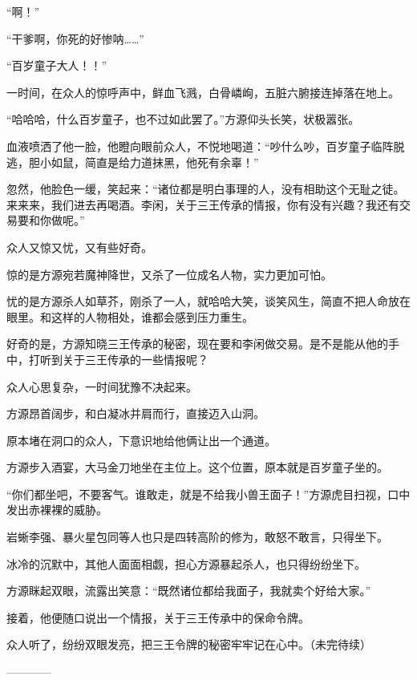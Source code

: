 \begin{this_body}
“啊！”

“干爹啊，你死的好惨呐……”

“百岁童子大人！！”

一时间，在众人的惊呼声中，鲜血飞溅，白骨嶙峋，五脏六腑接连掉落在地上。

“哈哈哈，什么百岁童子，也不过如此罢了。”方源仰头长笑，状极嚣张。

血液喷洒了他一脸，他瞪向眼前众人，不悦地喝道：“吵什么吵，百岁童子临阵脱逃，胆小如鼠，简直是给力道抹黑，他死有余辜！”

忽然，他脸色一缓，笑起来：“诸位都是明白事理的人，没有相助这个无耻之徒。来来来，我们进去再喝酒。李闲，关于三王传承的情报，你有没有兴趣？我还有交易要和你做呢。”

众人又惊又忧，又有些好奇。

惊的是方源宛若魔神降世，又杀了一位成名人物，实力更加可怕。

忧的是方源杀人如草芥，刚杀了一人，就哈哈大笑，谈笑风生，简直不把人命放在眼里。和这样的人物相处，谁都会感到压力重生。

好奇的是，方源知晓三王传承的秘密，现在要和李闲做交易。是不是能从他的手中，打听到关于三王传承的一些情报呢？

众人心思复杂，一时间犹豫不决起来。

方源昂首阔步，和白凝冰并肩而行，直接迈入山洞。

原本堵在洞口的众人，下意识地给他俩让出一个通道。

方源步入酒宴，大马金刀地坐在主位上。这个位置，原本就是百岁童子坐的。

“你们都坐吧，不要客气。谁敢走，就是不给我小兽王面子！”方源虎目扫视，口中发出赤裸裸的威胁。

岩蜥李强、暴火星包同等人也只是四转高阶的修为，敢怒不敢言，只得坐下。

冰冷的沉默中，其他人面面相觑，担心方源暴起杀人，也只得纷纷坐下。

方源眯起双眼，流露出笑意：“既然诸位都给我面子，我就卖个好给大家。”

接着，他便随口说出一个情报，关于三王传承中的保命令牌。

众人听了，纷纷双眼发亮，把三王令牌的秘密牢牢记在心中。（未完待续）

------------

\end{this_body}

